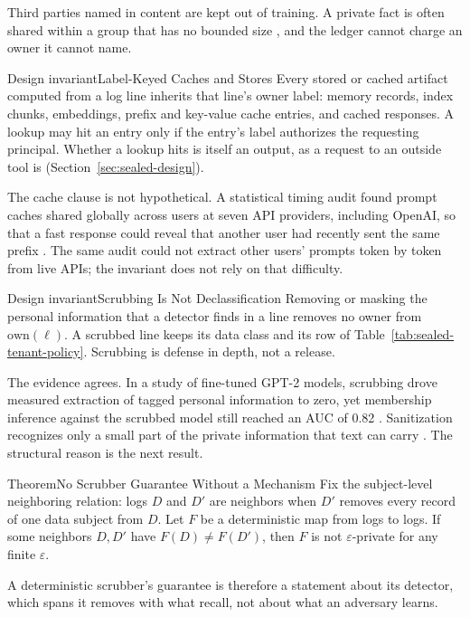 Third parties named in content are kept out of training. A private fact is
often shared within a group that has no bounded size
, and the ledger cannot charge an owner it cannot
name.

\begin{pdclaim}{Design invariant}{Label-Keyed Caches and Stores}
\setlength{\parskip}{4pt plus 1pt}
\label{inv:sealed-label-keyed}
Every stored or cached artifact computed from a log line inherits that line's
owner label: memory records, index chunks, embeddings, prefix and key-value
cache entries, and cached responses. A lookup may hit an entry only if the
entry's label authorizes the requesting principal. Whether a lookup hits is
itself an output, as a request to an outside tool is
(Section~\ref{sec:sealed-design}).
\end{pdclaim}

The cache clause is not hypothetical. A statistical timing audit found prompt
caches shared globally across users at seven API providers, including OpenAI,
so that a fast response could reveal that another user had recently sent the
same prefix . The same audit could not extract other
users' prompts token by token from live APIs; the invariant does not rely on
that difficulty.

\begin{pdclaim}{Design invariant}{Scrubbing Is Not Declassification}
\setlength{\parskip}{4pt plus 1pt}
\label{inv:sealed-scrub-not-declass}
Removing or masking the personal information that a detector finds in a line
removes no owner from $\mathrm{own}(\ell)$. A scrubbed line keeps its data class and its
row of Table~\ref{tab:sealed-tenant-policy}. Scrubbing is defense in depth,
not a release.
\end{pdclaim}

The evidence agrees. In a study of fine-tuned GPT-2 models, scrubbing drove
measured extraction of tagged personal information to zero, yet membership
inference against the scrubbed model still reached an AUC of 0.82
. Sanitization recognizes only a small part of the
private information that text can carry . The
structural reason is the next result.

\begin{pdclaim}{Theorem}{No Scrubber Guarantee Without a Mechanism}
\setlength{\parskip}{4pt plus 1pt}
\label{thm:sealed-no-scrubber}
Fix the subject-level neighboring relation: logs $D$ and $D'$ are neighbors
when $D'$ removes every record of one data subject from $D$. Let $F$ be a
deterministic map from logs to logs. If some neighbors $D,D'$ have
$F(D)\ne F(D')$, then $F$ is not $\varepsilon$-private for any finite
$\varepsilon$.

A deterministic scrubber's guarantee is therefore a statement about its
detector, which spans it removes with what recall, not about what an
adversary learns.
\end{pdclaim}


